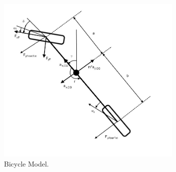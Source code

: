 \begin{figure}[h]
	\centering
	\includegraphics[width=0.8\textwidth]{Pictures/bicycle_model}
	\caption {Bicycle Model. \cite{fordonsdynamik99}}
	\label{bicycle_model}
\end{figure}

